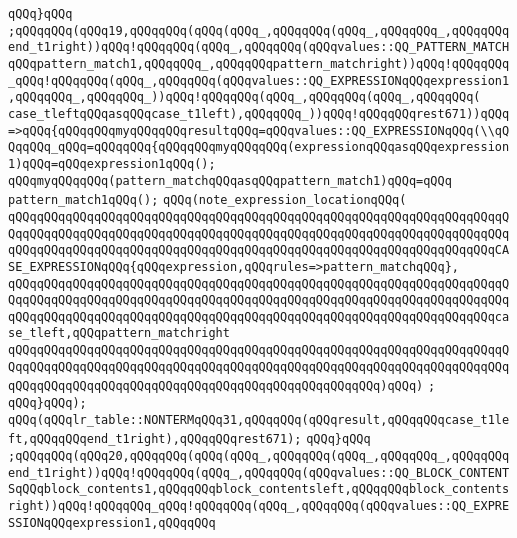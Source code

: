 \verb|qQQq}qQQq|\newline
\verb|;qQQqqQQq(qQQq19,qQQqqQQq(qQQq(qQQq_,qQQqqQQq(qQQq_,qQQqqQQq_,qQQqqQQqend_t1right))qQQq!qQQqqQQq(qQQq_,qQQqqQQq(qQQqvalues::QQ_PATTERN_MATCHqQQqpattern_match1,qQQqqQQq_,qQQqqQQqpattern_matchright))qQQq!qQQqqQQq_qQQq!qQQqqQQq(qQQq_,qQQqqQQq(qQQqvalues::QQ_EXPRESSIONqQQqexpression1,qQQqqQQq_,qQQqqQQq_))qQQq!qQQqqQQq(qQQq_,qQQqqQQq(qQQq_,qQQqqQQq(|\newline
\verb|case_tleftqQQqasqQQqcase_t1left),qQQqqQQq_))qQQq!qQQqqQQqrest671))qQQq=>qQQq{qQQqqQQqmyqQQqqQQqresultqQQq=qQQqvalues::QQ_EXPRESSIONqQQq(\\qQQqqQQq_qQQq=qQQqqQQq{qQQqqQQqmyqQQqqQQq(expressionqQQqasqQQqexpression1)qQQq=qQQqexpression1qQQq();|\newline
\verb|qQQqmyqQQqqQQq(pattern_matchqQQqasqQQqpattern_match1)qQQq=qQQq|\newline
\verb|pattern_match1qQQq();|\newline
\verb|qQQq(note_expression_locationqQQq(|\newline
\verb|qQQqqQQqqQQqqQQqqQQqqQQqqQQqqQQqqQQqqQQqqQQqqQQqqQQqqQQqqQQqqQQqqQQqqQQqqQQqqQQqqQQqqQQqqQQqqQQqqQQqqQQqqQQqqQQqqQQqqQQqqQQqqQQqqQQqqQQqqQQqqQQqqQQqqQQqqQQqqQQqqQQqqQQqqQQqqQQqqQQqqQQqqQQqqQQqqQQqqQQqqQQqqQQqCASE_EXPRESSIONqQQq{qQQqexpression,qQQqrules=>pattern_matchqQQq},|\newline
\verb|qQQqqQQqqQQqqQQqqQQqqQQqqQQqqQQqqQQqqQQqqQQqqQQqqQQqqQQqqQQqqQQqqQQqqQQqqQQqqQQqqQQqqQQqqQQqqQQqqQQqqQQqqQQqqQQqqQQqqQQqqQQqqQQqqQQqqQQqqQQqqQQqqQQqqQQqqQQqqQQqqQQqqQQqqQQqqQQqqQQqqQQqqQQqqQQqqQQqqQQqqQQqqQQqcase_tleft,qQQqpattern_matchright|\newline
\verb|qQQqqQQqqQQqqQQqqQQqqQQqqQQqqQQqqQQqqQQqqQQqqQQqqQQqqQQqqQQqqQQqqQQqqQQqqQQqqQQqqQQqqQQqqQQqqQQqqQQqqQQqqQQqqQQqqQQqqQQqqQQqqQQqqQQqqQQqqQQqqQQqqQQqqQQqqQQqqQQqqQQqqQQqqQQqqQQqqQQqqQQqqQQqqQQq)qQQq)|\newline
\verb|;|\newline
\verb|qQQq}qQQq);|\newline
\verb|qQQq(qQQqlr_table::NONTERMqQQq31,qQQqqQQq(qQQqresult,qQQqqQQqcase_t1left,qQQqqQQqend_t1right),qQQqqQQqrest671);|\newline
\verb|qQQq}qQQq|\newline
\verb|;qQQqqQQq(qQQq20,qQQqqQQq(qQQq(qQQq_,qQQqqQQq(qQQq_,qQQqqQQq_,qQQqqQQqend_t1right))qQQq!qQQqqQQq(qQQq_,qQQqqQQq(qQQqvalues::QQ_BLOCK_CONTENTSqQQqblock_contents1,qQQqqQQqblock_contentsleft,qQQqqQQqblock_contentsright))qQQq!qQQqqQQq_qQQq!qQQqqQQq(qQQq_,qQQqqQQq(qQQqvalues::QQ_EXPRESSIONqQQqexpression1,qQQqqQQq|\newline
